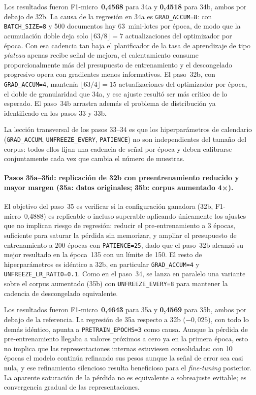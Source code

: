 Los resultados fueron F1-micro~\textbf{0,4568} para 34a y \textbf{0,4518} para 34b, ambos por debajo de 32b. La causa de la regresión en 34a es \texttt{GRAD\_ACCUM=8}: con \texttt{BATCH\_SIZE=8} y 500 documentos hay 63~mini-lotes por época, de modo que la acumulación doble deja solo $\lfloor 63/8 \rfloor = 7$ actualizaciones del optimizador por época. Con esa cadencia tan baja el planificador de la tasa de aprendizaje de tipo \emph{plateau} apenas recibe señal de mejora, el calentamiento consume proporcionalmente más del presupuesto de entrenamiento y el descongelado progresivo opera con gradientes menos informativos. El paso~32b, con \texttt{GRAD\_ACCUM=4}, mantenía $\lfloor 63/4 \rfloor = 15$ actualizaciones del optimizador por época, el doble de granularidad que 34a, y ese ajuste resultó ser más crítico de lo esperado. El paso~34b arrastra además el problema de distribución ya identificado en los pasos 33 y 33b.

\begin{sloppypar}
La lección transversal de los pasos 33--34 es que los hiperparámetros de calendario (\texttt{GRAD\_ACCUM}, \texttt{UNFREEZE\_EVERY}, \texttt{PATIENCE}) no son independientes del tamaño del corpus: todos ellos fijan una cadencia de señal por época y deben calibrarse conjuntamente cada vez que cambia el número de muestras.
\end{sloppypar}

\paragraph{Pasos 35a--35d: replicación de 32b con preentrenamiento reducido y mayor margen (35a: datos originales; 35b: corpus aumentado 4×).}
El objetivo del paso~35 es verificar si la configuración ganadora (32b, F1-micro~0,4888) es replicable o incluso superable aplicando únicamente los ajustes que no implican riesgo de regresión: reducir el pre-entrenamiento a 3 épocas, suficiente para saturar la pérdida sin memorizar, y ampliar el presupuesto de entrenamiento a 200 épocas con \texttt{PATIENCE=25}, dado que el paso~32b alcanzó su mejor resultado en la época~135 con un límite de 150. El resto de hiperparámetros es idéntico a 32b, en particular \texttt{GRAD\_ACCUM=4} y \texttt{UNFREEZE\_LR\_RATIO=0.1}. Como en el paso~34, se lanza en paralelo una variante sobre el corpus aumentado (35b) con \texttt{UNFREEZE\_EVERY=8} para mantener la cadencia de descongelado equivalente.

Los resultados fueron F1-micro~\textbf{0,4643} para 35a y \textbf{0,4569} para 35b, ambos por debajo de la referencia. La regresión de 35a respecto a 32b ($-0{,}025$), con todo lo demás idéntico, apunta a \texttt{PRETRAIN\_EPOCHS=3} como causa. Aunque la pérdida de pre-entrenamiento llegaba a valores próximos a cero ya en la primera época, esto no implica que las representaciones internas estuviesen consolidadas: con 10 épocas el modelo continúa refinando sus pesos aunque la señal de error sea casi nula, y ese refinamiento silencioso resulta beneficioso para el \emph{fine-tuning} posterior. La aparente saturación de la pérdida no es equivalente a sobreajuste evitable; es convergencia gradual de las representaciones.

